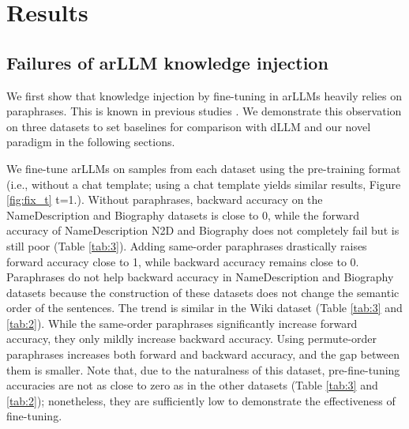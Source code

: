 \section{Results}

\subsection{Failures of arLLM knowledge injection}


We first show that knowledge injection by fine-tuning in arLLMs heavily relies on paraphrases. This is known in previous studies \citep{berglund2023reversal, zhu24b, lin2024delving, guo-etal-2024-mitigating, golovneva2024reverse}. We demonstrate this observation on three datasets to set baselines for comparison with dLLM and our novel paradigm in the following sections. %

We fine-tune arLLMs on samples from each dataset using the pre-training format (i.e., without a chat template; using a chat template yields similar results, Figure \ref{fig:fix_t} t=1.). Without paraphrases, backward accuracy on the NameDescription and Biography datasets is close to 0, while the forward accuracy of NameDescription N2D and Biography does not completely fail but is still poor (Table \ref{tab:3}). Adding same-order paraphrases drastically raises forward accuracy close to 1, while backward accuracy remains close to 0. Paraphrases do not help backward accuracy in NameDescription and Biography datasets because the construction of these datasets does not change the semantic order of the sentences.
The trend is similar in the Wiki dataset (Table \ref{tab:3} and \ref{tab:2}). While the same-order paraphrases significantly increase forward accuracy, they only mildly increase backward accuracy. Using permute-order paraphrases increases both forward and backward accuracy, and the gap between them is smaller. Note that, due to the naturalness of this dataset, pre-fine-tuning accuracies are not as close to zero as in the other datasets (Table \ref{tab:3} and \ref{tab:2}); nonetheless, they are sufficiently low to demonstrate the effectiveness of fine-tuning.

